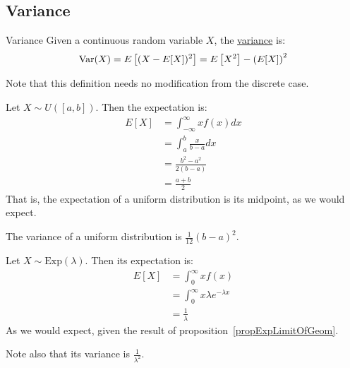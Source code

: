 \documentclass[../Main.tex]{subfiles}
\begin{document}
\subsection{Variance}
\begin{definition}{Variance}
    Given a continuous random variable $X$, the \underline{variance} is:
    \begin{equation*}
        \operatorname{Var}(X) = E\left[(X - E[X])^2\right] = E\left[X^2\right] - \left(E[X]\right)^2
    \end{equation*}
\end{definition}
\begin{remark}
    Note that this definition needs no modification from the discrete case.
\end{remark}
\begin{example}
    Let $X \sim U([a, b])$. Then the expectation is:
    \begin{align*}
        E[X] &= \int_{-\infty}^\infty xf(x) dx \\
        &= \int_a^b \frac{x}{b-a} dx \\
        &= \frac{b^2-a^2}{2(b-a)} \\
        &= \frac{a + b}{2}
    \end{align*}
    That is, the expectation of a uniform distribution is its midpoint, as we would expect.\par
    The variance of a uniform distribution is $\frac{1}{12}(b - a)^2$.
\end{example}
\begin{example}
    Let $X \sim \text{Exp}(\lambda)$. Then its expectation is:
    \begin{align*}
        E[X] &= \int_0^\infty xf(x) \\
        &= \int_0^\infty x \lambda e^{-\lambda x} \\
        &= \frac{1}{\lambda}
    \end{align*}
    As we would expect, given the result of proposition~\ref{propExpLimitOfGeom}.\par
    Note also that its variance is $\frac{1}{\lambda^2}$.
\end{example}
\end{document}
